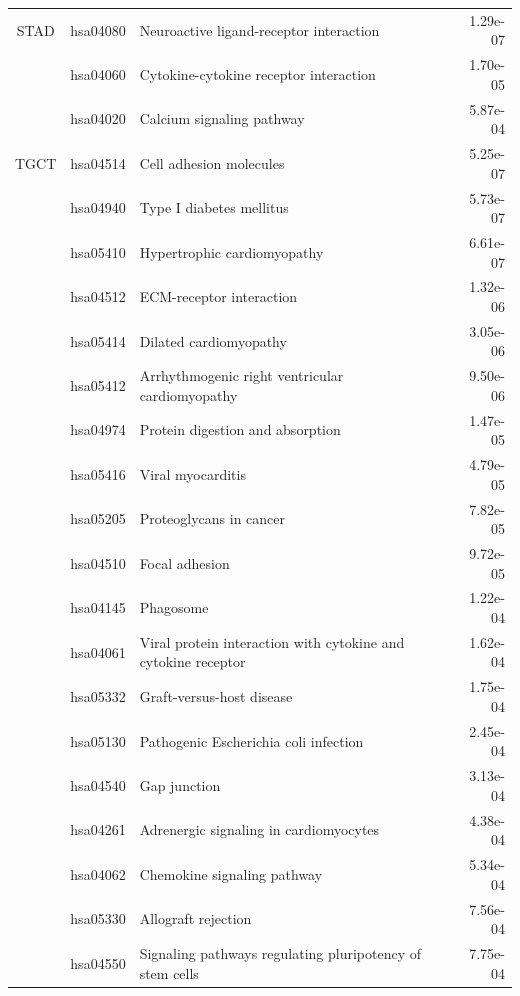 \begin{longtable}{cllr}
\midrule 
STAD & hsa04080 & \textcolor{\clrnew}{Neuroactive ligand-receptor interaction} & 1.29e-07\\ 
 & hsa04060 & \textcolor{\clrnew}{Cytokine-cytokine receptor interaction} & 1.70e-05 \\ 
 & hsa04020 & \textcolor{\clrnew}{Calcium signaling pathway} & 5.87e-04 \\ 
\midrule 
TGCT & hsa04514 & \textcolor{\clrnew}{Cell adhesion molecules} & 5.25e-07\\ 
 & hsa04940 & \textcolor{\clrnew}{Type I diabetes mellitus} & 5.73e-07 \\ 
 & hsa05410 & \textcolor{\clrnew}{Hypertrophic cardiomyopathy} & 6.61e-07 \\ 
 \rowcolor{\clrmatch}& hsa04512 & ECM-receptor interaction & 1.32e-06 \\ 
 & hsa05414 & \textcolor{\clrnew}{Dilated cardiomyopathy} & 3.05e-06 \\ 
 & hsa05412 & \textcolor{\clrnew}{Arrhythmogenic right ventricular cardiomyopathy} & 9.50e-06 \\ 
 \rowcolor{\clrmatch}& hsa04974 & Protein digestion and absorption & 1.47e-05 \\ 
 & hsa05416 & \textcolor{\clrnew}{Viral myocarditis} & 4.79e-05 \\ 
 & hsa05205 & \textcolor{\clrnew}{Proteoglycans in cancer} & 7.82e-05 \\ 
 & hsa04510 & \textcolor{\clrnew}{Focal adhesion} & 9.72e-05 \\ 
 & hsa04145 & \textcolor{\clrnew}{Phagosome} & 1.22e-04 \\ 
 & hsa04061 & \textcolor{\clrnew}{Viral protein interaction with cytokine and cytokine receptor} & 1.62e-04 \\ 
 & hsa05332 & \textcolor{\clrnew}{Graft-versus-host disease} & 1.75e-04 \\ 
 & hsa05130 & \textcolor{\clrnew}{Pathogenic Escherichia coli infection} & 2.45e-04 \\ 
 & hsa04540 & \textcolor{\clrnew}{Gap junction} & 3.13e-04 \\ 
 & hsa04261 & \textcolor{\clrnew}{Adrenergic signaling in cardiomyocytes} & 4.38e-04 \\ 
 & hsa04062 & \textcolor{\clrnew}{Chemokine signaling pathway} & 5.34e-04 \\ 
 & hsa05330 & \textcolor{\clrnew}{Allograft rejection} & 7.56e-04 \\ 
 & hsa04550 & \textcolor{\clrnew}{Signaling pathways regulating pluripotency of stem cells} & 7.75e-04 \\ 

\end{longtable}
